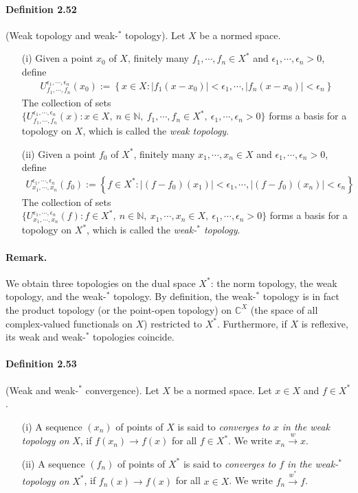 \documentclass{article}
\begin{document}
\paragraph{Definition 2.52\label{def:2.52}} (Weak topology and weak-$^*$ topology). Let $X$ be a normed space.
\begin{itemize}
\vspace{0.1cm}
\item[(i)] Given a point $x_0$ of $X$, finitely many $f_1,\cdots,f_n\in X^*$ and $\epsilon_1,\cdots,\epsilon_n > 0$, define
\begin{align*}
	U_{f_1,\cdots,f_n}^{\epsilon_1,\cdots,\epsilon_n}(x_0) := \left\{x\in X: \vert f_1(x-x_0)\vert < \epsilon_1,\cdots,\vert f_n(x-x_0)\vert < \epsilon_n\right\}
\end{align*}
The collection of sets $\bigl\{U_{f_1,\cdots,f_n}^{\epsilon_1,\cdots,\epsilon_n}(x):x\in X,\ n\in\mathbb{N},\ f_1,\cdots,f_n\in X^*,\ \epsilon_1,\cdots,\epsilon_n > 0\bigr\}$ forms a basis for a topology on $X$, which is called the \textit{weak topology}.
\vspace{0.1cm}
\item[(ii)] Given a point $f_0$ of $X^*$, finitely many $x_1,\cdots,x_n\in X$ and $\epsilon_1,\cdots,\epsilon_n > 0$, define
\begin{align*}
	U_{x_1,\cdots,x_n}^{\epsilon_1,\cdots,\epsilon_n}(f_0) := \left\{f\in X^*: \vert (f - f_0)(x_1)\vert < \epsilon_1,\cdots,\vert (f - f_0)(x_n)\vert < \epsilon_n\right\}
\end{align*}
The collection of sets $\bigl\{U_{x_1,\cdots,x_n}^{\epsilon_1,\cdots,\epsilon_n}(f):f\in X^*,\ n\in\mathbb{N},\ x_1,\cdots,x_n\in X,\ \epsilon_1,\cdots,\epsilon_n > 0\bigr\}$ forms a basis for a topology on $X^*$, which is called the \textit{weak-$^*$ topology}.
\end{itemize}
\paragraph{Remark.} We obtain three topologies on the dual space $X^*$: the norm topology, the weak topology, and the weak-$^*$ topology. By definition, the weak-$^*$ topology is in fact the product topology (or the point-open topology) on $\mathbb{C}^X$ (the space of all complex-valued functionals on $X$) restricted to $X^*$. Furthermore, if $X$ is reflexive, its weak and weak-$^*$ topologies coincide.

\paragraph{Definition 2.53\label{def:2.53}} (Weak and weak-$^*$ convergence). Let $X$ be a normed space. Let $x\in X$ and $f\in X^*$.
\begin{itemize}
\item[(i)] A sequence $(x_n)$ of points of $X$ is said to \textit{converges to $x$ in the weak topology on} $X$, if
$f(x_n)\to f(x)$ for all $f\in X^*$. We write $x_n\overset{w}{\to} x$.
\item[(ii)] A sequence $(f_n)$ of points of $X^*$ is said to \textit{converges to $f$ in the weak-$^*$ topology on} $X^*$, if
$f_n(x)\to f(x)$ for all $x\in X$. We write $f_n\overset{w^*}{\to} f$.
\end{itemize}
\end{document}
